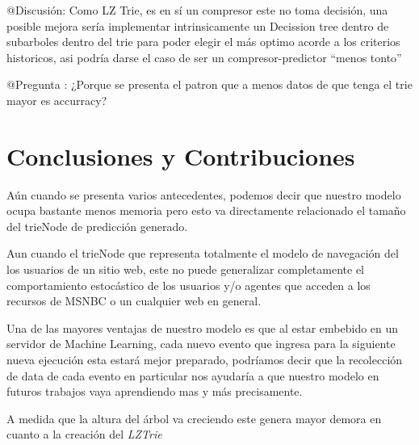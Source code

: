 @Discusión: Como LZ Trie, es en sí un compresor este no toma decisión, una posible mejora
sería implementar intrinsicamente un Decission tree dentro de subarboles dentro del trie para
poder elegir el más optimo acorde a los criterios historicos, asi podría darse el caso de ser
un compresor-predictor  ``menos tonto''


@Pregunta : ¿Porque se presenta el patron que a menos datos de que tenga el trie mayor es accurracy?

























\vspace{2cm}

\section{Conclusiones y Contribuciones}


Aún cuando se presenta varios antecedentes, podemos decir que nuestro modelo ocupa bastante menos memoria pero esto va directamente relacionado el tamaño del trieNode de predicción generado.

%
Aun cuando el trieNode que representa totalmente el modelo de navegación del los usuarios de un sitio web, este no puede generalizar completamente el comportamiento estocástico de los usuarios y/o agentes que acceden a los recursos de MSNBC o un cualquier web en general.

Una de las mayores ventajas de nuestro modelo es que al estar embebido en un servidor de Machine Learning, cada nuevo evento que ingresa para la siguiente nueva ejecución esta estará mejor preparado, podríamos decir que la recolección de data de cada evento en particular nos ayudaría a que nuestro modelo en futuros trabajos vaya aprendiendo mas y más precisamente.


A medida que la altura del árbol va creciendo este genera mayor demora en cuanto a la creación del \emph{LZTrie}


